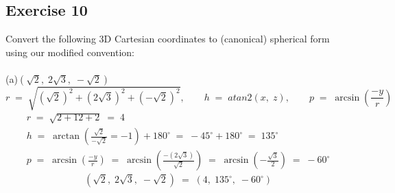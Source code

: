 \documentclass[12pt, a4paper]{article}
\begin{document}
\newpage\quad

\subsection*{Exercise 10}
Convert the following 3D Cartesian coordinates to (canonical) spherical form using our modified convention:\\\\
	(a)\quad$\left(\sqrt{2},\;2\sqrt{3},\;-\sqrt{2}\right)$
		\begin{equation}
			\tag*{}
				r\;=\;\sqrt
				{
					\left(\sqrt{2}\right)^2+
					\left(2\sqrt{3}\right)^2+
					\left(-\sqrt{2}\right)^2
				}, \qquad
				h\;=\;atan2(x,\;z), \qquad
				p\;=\;\arcsin\left(\frac{-y}{r}\right)
		\end{equation}
		\begin{gather}
			\tag*{}
				r\;=\;\sqrt{2+12+2}\;=\;4\\
			\tag*{}
				h\;=\;\arctan\left(\frac
				{
				\sqrt{2}}{-\sqrt{2}
				}
				=-1\right)+180^\circ
				\;=\;-45^\circ+180^\circ\;=\;135^\circ\\
			\tag*{}
				p\;=\;\arcsin\left(
					\frac{-y}{r}
				\right)\;=\;\arcsin\left(\frac{
					-\left(
					2\sqrt{3}\right)
				}{\sqrt{2}}\right)\;=\;\arcsin\left(-\frac{
					\sqrt{3}}{2
				}\right)\;=\;-60^\circ
		\end{gather}
		\begin{equation}
			\tag*{}
				\left(\sqrt{2},\;2\sqrt{3},\;-\sqrt{2}\right)
				\;=\;(4,\;135^\circ,\;-60^\circ)
		\end{equation}
\end{document}
